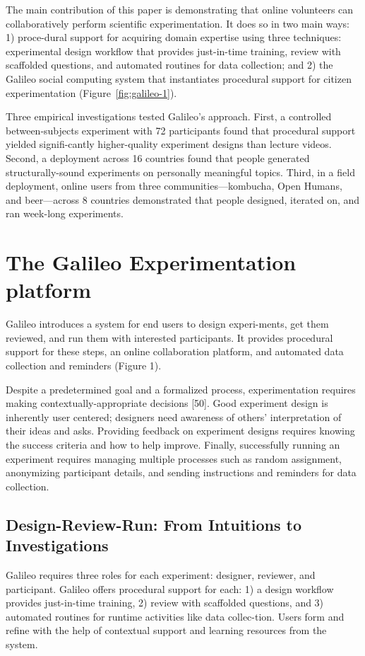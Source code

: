 The main contribution of this paper is demonstrating that online volunteers can collaboratively perform scientific experimentation. It does so in two main ways: 1) proce-dural support for acquiring domain expertise using three techniques: experimental design workflow that provides just-in-time training, review with scaffolded questions, and automated routines for data collection; and 2) the Galileo social computing system that instantiates procedural support for citizen experimentation (Figure~\ref{fig:galileo-1}). 

Three empirical investigations tested Galileo’s approach. First, a controlled between-subjects experiment with 72 participants found that procedural support yielded signifi-cantly higher-quality experiment designs than lecture videos. Second, a deployment across 16 countries found that people generated structurally-sound experiments on personally meaningful topics. Third, in a field deployment, online users from three communities—kombucha, Open Humans, and beer—across 8 countries demonstrated that people designed, iterated on, and ran week-long experiments.



\section{The Galileo Experimentation platform}
Galileo introduces a system for end users to design experi-ments, get them reviewed, and run them with interested participants. It provides procedural support for these steps, an online collaboration platform, and automated data collection and reminders (Figure 1).

Despite a predetermined goal and a formalized process, experimentation requires making contextually-appropriate decisions [50]. Good experiment design is inherently user centered; designers need awareness of others’ interpretation of their ideas and asks. Providing feedback on experiment designs requires knowing the success criteria and how to help improve. Finally, successfully running an experiment requires managing multiple processes such as random assignment, anonymizing participant details, and sending instructions and reminders for data collection.

\subsection{Design-Review-Run: From Intuitions to Investigations}
Galileo requires three roles for each experiment: designer, reviewer, and participant. Galileo offers procedural support for each: 1) a design workflow provides just-in-time training, 2) review with scaffolded questions, and 3) automated routines for runtime activities like data collec-tion. Users form and refine with the help of contextual support and learning resources from the system. 

